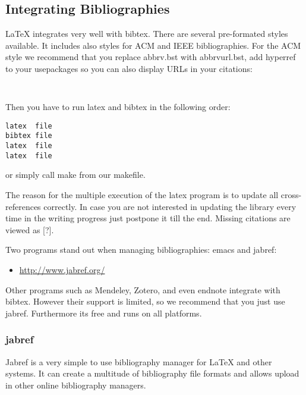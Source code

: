 \FILENAME

\subsection{Integrating Bibliographies}\label{bibliographies}

LaTeX integrates very well with bibtex. There are several pre-formated
styles available. It includes also styles for ACM and IEEE
bibliographies. For the ACM style we recommend that you replace
abbrv.bst with abbrvurl.bst, add hyperref to your usepackages so you can
also display URLs in your citations:

\begin{verbatim}


\end{verbatim}

Then you have to run latex and bibtex in the following order:

\begin{verbatim}
latex  file
bibtex file
latex  file
latex  file
\end{verbatim}

or simply call make from our makefile.

The reason for the multiple execution of the latex program is to update
all cross-references correctly. In case you are not interested in
updating the library every time in the writing progress just postpone it
till the end. Missing citations are viewed as {[}?{]}.

Two programs stand out when managing bibliographies: emacs and jabref:

\begin{itemize}
\tightlist
\item
  \url{http://www.jabref.org/}
\end{itemize}

Other programs such as Mendeley, Zotero, and even endnote integrate with
bibtex. However their support is limited, so we recommend that you just
use jabref. Furthermore its free and runs on all platforms.

\subsubsection{jabref}\label{jabref}

Jabref is a very simple to use bibliography manager for LaTeX and other
systems. It can create a multitude of bibliography file formats and
allows upload in other online bibliography managers.

